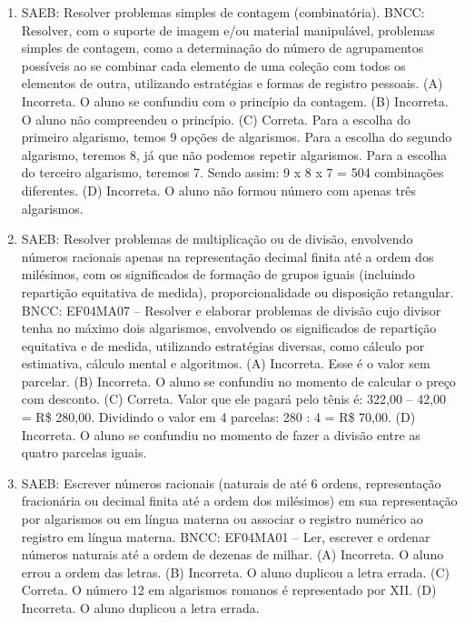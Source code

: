 \begin{enumerate}
\item
SAEB: Resolver problemas simples de contagem (combinatória).
BNCC: Resolver, com o suporte de imagem e/ou material manipulável, problemas simples
de contagem, como a determinação do número de agrupamentos possíveis ao se combinar cada
elemento de uma coleção com todos os elementos de outra, utilizando estratégias e formas de
registro pessoais.
(A) Incorreta. O aluno se confundiu com o princípio da contagem.
(B) Incorreta. O aluno não compreendeu o princípio.
(C) Correta. Para a escolha do primeiro algarismo, temos 9 opções de algarismos. Para
a escolha do segundo algarismo, teremos 8, já que não podemos repetir
algarismos. Para a escolha do terceiro algarismo, teremos 7. Sendo assim: 9 x 8 x 7 = 504 combinações diferentes.
(D) Incorreta. O aluno não formou número com apenas três algarismos.

\item
SAEB: Resolver problemas de multiplicação ou de divisão,
envolvendo números racionais apenas na representação decimal finita até
a ordem dos milésimos, com os significados de formação de grupos iguais
(incluindo repartição equitativa de medida), proporcionalidade ou
disposição retangular.
BNCC: EF04MA07 -- Resolver e elaborar problemas de divisão cujo divisor tenha no máximo dois algarismos,
envolvendo os significados de repartição equitativa e de medida, utilizando estratégias diversas,
como cálculo por estimativa, cálculo mental e algoritmos.
(A) Incorreta. Esse é o valor sem parcelar.
(B) Incorreta. O aluno se confundiu no momento de calcular o preço com desconto.
(C) Correta. Valor que ele pagará pelo tênis é: 322,00 -- 42,00 = R\$ 280,00.
Dividindo o valor em 4 parcelas: 280 : 4 = R\$ 70,00.
(D) Incorreta. O aluno se confundiu no momento de fazer a divisão entre as quatro parcelas iguais.

\item
SAEB: Escrever números racionais (naturais de até 6 ordens, representação
fracionária ou decimal finita até a ordem dos milésimos) em sua
representação por algarismos ou em língua materna ou associar o registro
numérico ao registro em língua materna.
BNCC: EF04MA01 -- Ler, escrever e ordenar números naturais até a ordem de dezenas de milhar.
(A) Incorreta. O aluno errou a ordem das letras.
(B) Incorreta. O aluno duplicou a letra errada.
(C) Correta. O número 12 em algarismos romanos é representado por XII.
(D) Incorreta. O aluno duplicou a letra errada.
\end{enumerate}